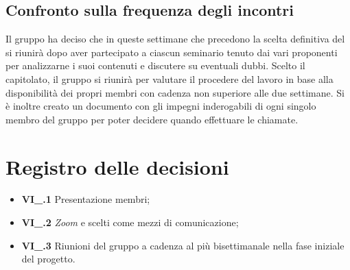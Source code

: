 \subsection{Confronto sulla frequenza degli incontri}
Il gruppo ha deciso che in queste settimane che precedono la scelta definitiva del  si riunirà dopo aver partecipato a ciascun seminario tenuto dai vari proponenti per analizzarne i suoi contenuti e discutere su eventuali dubbi. Scelto il capitolato, il gruppo si riunirà per valutare il procedere del lavoro in base alla disponibilità dei propri membri con cadenza non superiore alle due settimane. Si è inoltre creato un documento con gli impegni inderogabili di ogni singolo membro del gruppo per poter decidere quando effettuare le chiamate.

\section{Registro delle decisioni}
\begin{itemize}
  \item \textbf{VI\_\Data.1} Presentazione membri;
  \item \textbf{VI\_\Data.2} \textit{Zoom} e  scelti come mezzi di comunicazione;
  \item \textbf{VI\_\Data.3} Riunioni del gruppo a cadenza al più bisettimanale nella fase iniziale del progetto.
\end{itemize}




